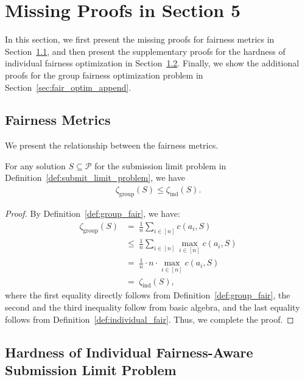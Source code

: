 \section{Missing Proofs in Section 5}\label{sec:fair_proof}
In this section, we first present the missing proofs for fairness metrics in Section~\ref{sec:fair_metric_append}, and then present the supplementary proofs for the hardness of individual fairness optimization in Section~\ref{sec:indi_fair_hard_append}. Finally, we show the additional proofs for the group fairness optimization problem in Section~\ref{sec:fair_optim_append}.

\subsection{Fairness Metrics}\label{sec:fair_metric_append}
We present the relationship between the fairness metrics.  

\begin{proposition}\label{lem:fair_metric_ineq_append}
    For any solution $S\subseteq \mathcal{P}$ for the submission limit problem in Definition~\ref{def:submit_limit_problem}, we have 
    \begin{align*}
        \zeta_{\mathrm{group}}(S) \leq \zeta_{\mathrm{ind}}(S).
    \end{align*}
\end{proposition}
\begin{proof}
    By Definition~\ref{def:group_fair}, we have:
    \begin{align*}
        \zeta_{\mathrm{group}}(S) &=~ \frac{1}{n}\sum_{i \in [n]} c(a_i,S) \\
        &\leq~ \frac{1}{n}\sum_{i \in [n]} \max_{i\in[n]}c(a_i, S) \\ 
        &=~\frac{1}{n}\cdot n \cdot \max_{i\in[n]}c(a_i, S) \\ 
        &=~ \zeta_{\mathrm{ind}}(S),
    \end{align*}
where the first equality directly follows from Definition~\ref{def:group_fair}, the second and the third inequality follow from basic algebra, and the last equality follows from Definition~\ref{def:individual_fair}. Thus, we complete the proof.
\end{proof}

\subsection{Hardness of Individual Fairness-Aware Submission Limit Problem}\label{sec:indi_fair_hard_append}

